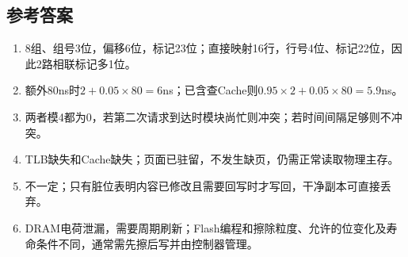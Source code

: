 \subsection{参考答案}\label{CO03-answers}

{\begin{recallcard}[自拟题核对答案]

\begin{enumerate}
\def\labelenumi{\arabic{enumi}.}
\setcounter{enumi}{3}
\tightlist
\item
  8组、组号3位，偏移6位，标记23位；直接映射16行，行号4位、标记22位，因此2路相联标记多1位。
\item
  额外80ns时\(2+0.05\times80=6\)ns；已含查Cache则\(0.95\times2+0.05\times80=5.9\)ns。
\item
  两者模4都为0，若第二次请求到达时模块尚忙则冲突；若时间间隔足够则不冲突。
\item
  TLB缺失和Cache缺失；页面已驻留，不发生缺页，仍需正常读取物理主存。
\item
  不一定；只有脏位表明内容已修改且需要回写时才写回，干净副本可直接丢弃。
\item
  DRAM电荷泄漏，需要周期刷新；Flash编程和擦除粒度、允许的位变化及寿命条件不同，通常需先擦后写并由控制器管理。
\end{enumerate}

\end{recallcard}}

